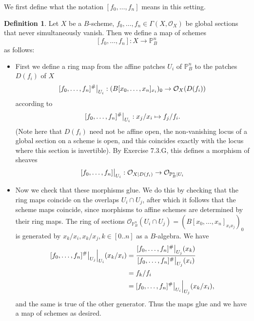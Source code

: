 \documentclass{article}
\newcommand\restr[2]{{%
  \left.\kern-\nulldelimiterspace %
  #1 %
  \vphantom{\big|} %
  \right|_{#2} %
  }}
\theoremstyle{definition}
\newtheorem{definition}[theorem]{Definition}
\renewcommand{\P}{\mathbb{P}}
\newcommand{\Pn}{\P^n}
\begin{document}
We first define what the notation $[f_{0}, \ldots, f_n]$ means in this setting.
\begin{definition}
	Let $X$ be a $B$-scheme, $f_{0}, \ldots, f_n \in \Gamma(X, \mathcal{O}_X)$
	be global sections that never simultaneously vanish. Then we define a map
	of schemes
	\[
		[f_{0}, \ldots, f_n] : X \to \Pn_{B}
	\]
	as follows:
	\begin{itemize}
		\item First we define a ring map from the affine patches $U_i$ of $\Pn_{B}$
		      to the patches $D(f_i)$ of $X$
		      \[
			      \restr{[f_{0}, \ldots, f_n]^{\#}}{U_i}
			      :
			      (B[x_{0}, \ldots, x_n]_{x_i})_0
			      \to
			      \mathcal{O}_X(D(f_i))
		      \]
		      according to
		      \[
			      \restr{[f_{0}, \ldots, f_n]^{\#}}{U_i}
			      :
			      x_j/x_i
			      \mapsto
			      f_j/f_i.
		      \]
		      (Note here that $D(f_i)$ need not be affine open, the non-vanishing
		      locus of a global section on a scheme is open, and this coincides
		      exactly with the locus where this section is invertible). By
		      Exercise 7.3.G, this defines a morphism of sheaves
		      \[
			      \restr{[f_{0}, \ldots, f_n]}{U_i}
			      :
			      \mathcal{O}_{X \vert D(f_i)}
			      \to
			      \mathcal{O}_{\Pn_{B} \vert U_i}
		      \]
		\item Now we check that these morphisms glue. We do this by checking
		      that the ring maps coincide on the overlaps $U_i \cap U_j$, after
		      which it follows that the scheme maps coincide, since morphisms to
		      affine schemes are determined by their ring maps. The ring of
		      sections $\mathcal{O}_{\Pn_{B}}(U_i \cap U_j) = (B[x_{0}, \ldots,
					      x_n]_{x_ix_j})_0$ is generated by $x_k/x_i, x_k/x_j, k \in [0..n]$
		      as a $B$-algebra. We have
		      \begin{align*}
			      \restr{\restr{[f_{0}, \ldots, f_n]^{\#}}{U_j}}{U_i}(x_k/x_i)
			       & =
			      \frac{
				      \restr{[f_{0}, \ldots, f_n]^{\#}}{U_j}(x_k)
			      }{
				      \restr{[f_{0}, \ldots, f_n]^{\#}}{U_j}(x_i)
			      }       \\
			       & =
			      f_k/f_i \\
			       & =
			      \restr{\restr{[f_{0}, \ldots, f_n]^{\#}}{U_i}}{U_j}(x_k/x_i),
		      \end{align*}
		      and the same is true of the other generator. Thus the maps glue and
		      we have a map of schemes as desired.
	\end{itemize}
\end{definition}
\end{document}
